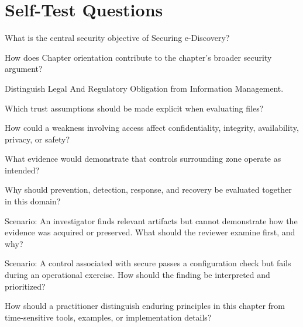\documentclass[11pt,letterpaper]{article}
\begin{document}
\section*{Self-Test Questions}
\begin{CornellRecallList}
\item What is the central security objective of Securing e-Discovery?
\item How does Chapter orientation contribute to the chapter's broader security argument?
\item Distinguish Legal And Regulatory Obligation from Information Management.
\item Which trust assumptions should be made explicit when evaluating files?
\item How could a weakness involving access affect confidentiality, integrity, availability, privacy, or safety?
\item What evidence would demonstrate that controls surrounding zone operate as intended?
\item Why should prevention, detection, response, and recovery be evaluated together in this domain?
\item Scenario: An investigator finds relevant artifacts but cannot demonstrate how the evidence was acquired or preserved. What should the reviewer examine first, and why?
\item Scenario: A control associated with secure passes a configuration check but fails during an operational exercise. How should the finding be interpreted and prioritized?
\item How should a practitioner distinguish enduring principles in this chapter from time-sensitive tools, examples, or implementation details?
\end{CornellRecallList}
\end{document}
